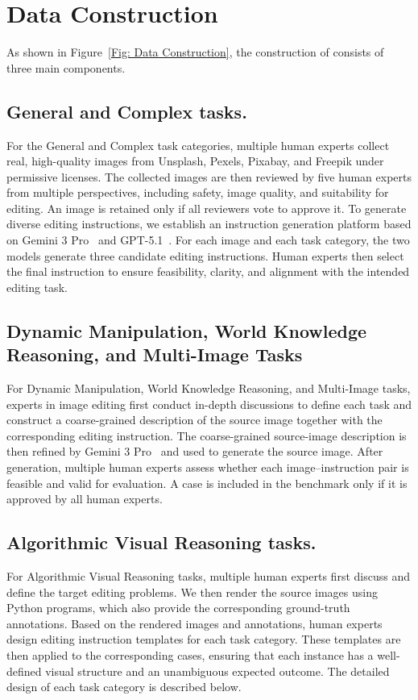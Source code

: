 \section{{\bench} Data Construction}
\label{supp: Edit-Compass Data Construction}
As shown in Figure~\ref{Fig: Data Construction}, the construction of {\bench} consists of three main components.

\subsection{General and  Complex tasks.}
For the General and Complex task categories, multiple human experts collect real, high-quality images from Unsplash, Pexels, Pixabay, and Freepik under permissive licenses. The collected images are then reviewed by five human experts from multiple perspectives, including safety, image quality, and suitability for editing. An image is retained only if all reviewers vote to approve it. To generate diverse editing instructions, we establish an instruction generation platform based on Gemini 3 Pro~\cite{gemini3pro} and GPT-5.1~\cite{openai2025gpt51}. For each image and each task category, the two models generate three candidate editing instructions. Human experts then select the final instruction to ensure feasibility, clarity, and alignment with the intended editing task.

\subsection{Dynamic Manipulation, World Knowledge Reasoning, and Multi-Image Tasks}
For Dynamic Manipulation, World Knowledge Reasoning, and Multi-Image tasks, experts in image editing first conduct in-depth discussions to define each task and construct a coarse-grained description of the source image together with the corresponding editing instruction. The coarse-grained source-image description is then refined by Gemini 3 Pro~\cite{gemini3pro} and used to generate the source image. After generation, multiple human experts assess whether each image--instruction pair is feasible and valid for evaluation. A case is included in the benchmark only if it is approved by all human experts.

\subsection{Algorithmic Visual Reasoning tasks.}
\label{Algorithm Visual Reasoning tasks}
For Algorithmic Visual Reasoning tasks, multiple human experts first discuss and define the target editing problems. We then render the source images using Python programs, which also provide the corresponding ground-truth annotations. Based on the rendered images and annotations, human experts design editing instruction templates for each task category. These templates are then applied to the corresponding cases, ensuring that each instance has a well-defined visual structure and an unambiguous expected outcome.  The detailed design of each task category is described below.

